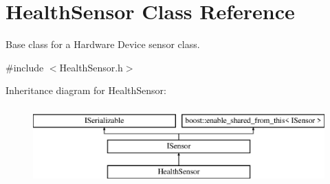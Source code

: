 \hypertarget{class_health_sensor}{}\section{Health\+Sensor Class Reference}
\label{class_health_sensor}


Base class for a Hardware Device sensor class.  




{\ttfamily \#include $<$Health\+Sensor.\+h$>$}

Inheritance diagram for Health\+Sensor\+:\begin{figure}[H]
\begin{center}
\leavevmode
\includegraphics[height=3.000000cm]{class_health_sensor}
\end{center}
\end{figure}

